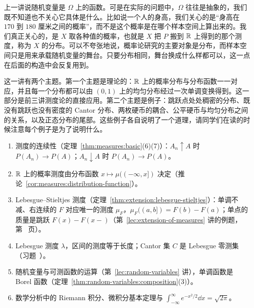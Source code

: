 \label{lec:distributions}

上一讲说随机变量是 $\Omega$ 上的函数。可是在实际的问题中，$\Omega$ 往往是抽象的，我们既不知道也不关心它具体是什么。比如说一个人的身高，我们关心的是“身高在 $170$ 到 $180$ 厘米之间的概率”，而不是这个概率是在哪个样本空间上算出来的。我们真正关心的，是 $X$ 取各种值的概率，也就是 $X$ 把 $P$ 搬到 $\mathbb{R}$ 上得到的那个测度，称为 $X$ 的分布。可以不夸张地说，概率论研究的主要对象是分布，而样本空间只是用来承载随机变量的舞台。只要分布相同，舞台换成什么样都可以，这一点在后面的构造中会反复用到。

这一讲有两个主题。第一个主题是理论的：$\mathbb{R}$ 上的概率分布与分布函数一一对应，并且每一个分布都可以由 $(0,1)$ 上的均匀分布经过一次单调变换得到。这一部分是前三讲测度论的直接应用。第二个主题是例子：跳跃点处处稠密的分布、既没有跳跃也没有密度的 Cantor 分布、两枚硬币的耦合、公平硬币与均匀分布之间的关系，以及正态分布的尾部。这些例子各自说明了一个道理，请同学们在读的时候注意每个例子是为了说明什么。


\begin{enumerate}
\item 测度的连续性（定理~\ref{thm:measures:basic}(6)(7)）：$A_n\uparrow A$ 时 $P(A_n)\to P(A)$；$A_n\downarrow A$ 时 $P(A_n)\to P(A)$。
\item $\mathbb{R}$ 上的概率测度由分布函数 $x\mapsto\mu((-\infty,x])$ 决定（推论~\ref{cor:measures:distribution-function}）。
\item Lebesgue--Stieltjes 测度（定理~\ref{thm:extension:lebesgue-stieltjes}）：单调不减、右连续的 $F$ 对应唯一的测度 $\mu_F$，$\mu_F((a,b])=F(b)-F(a)$；单点的质量是跳跃 $F(x)-F(x-)$（第~\ref{lec:extension-of-measures} 讲的例题，第~\pageref{we:extension:atoms} 页）。
\item Lebesgue 测度 $\lambda$，区间的测度等于长度；Cantor 集 $C$ 是 Lebesgue 零测集（习题~）。
\item 随机变量与可测函数的运算（第~\ref{lec:random-variables} 讲），单调函数是 Borel 函数（定理~\ref{thm:random-variables:composition}(3)）。
\item 数学分析中的 Riemann 积分、微积分基本定理与 $\int_{-\infty}^\infty e^{-x^2/2}\dd x=\sqrt{2\pi}$。
\end{enumerate}

